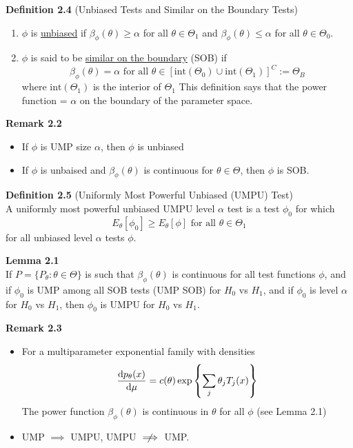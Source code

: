 \documentclass[12pt]{article}
\numberwithin{equation}{section}
\begin{document}
\textbf{Definition 2.4} (Unbiased Tests and Similar on the Boundary Tests)
\begin{enumerate}
  \item $\phi$ is \underline{unbiased} if $\beta_{\phi}(\theta) \ge \alpha$ for all $\theta \in \Theta_1$ and $\beta_{\phi}(\theta) \le \alpha$ for all 
  $\theta \in \Theta_0$. \\
  \item $\phi$ is said to be \underline{similar on the boundary} (SOB) if
  \begin{equation*}
    \beta_{\phi}(\theta) = \alpha \text{ for all } \theta \in 
      [\text{int}(\Theta_0) \cup \text{int}(\Theta_1)]^C := \Theta_B
  \end{equation*}
  where $\text{int}(\Theta_1)$ is the interior of $\Theta_1$ This definition says that the power function = $\alpha$ on the boundary of the parameter space.
\end{enumerate}

\textbf{Remark 2.2}
\begin{itemize}
  \item If $\phi$ is UMP size $\alpha$, then $\phi$ is unbiased
  \item If $\phi$ is unbaised and $\beta_{\phi}(\theta)$ is continuous for $\theta \in \Theta$, then $\phi$ is SOB. 
\end{itemize}

\textbf{Definition 2.5} (Uniformly Most Powerful Unbiased (UMPU) Test) \\
A uniformly most powerful unbiased UMPU level $\alpha$ test is a test $\phi_0$ for which
\begin{equation*}
  E_{\theta}[\phi_0] \ge E_{\theta}[\phi] \text{ for all } \theta \in \Theta_1
\end{equation*}
for all unbiased level $\alpha$ tests $\phi$. 

\textbf{Lemma 2.1} \\
If $P = \{P_{\theta} : \theta \in \Theta \}$ is such that $\beta_{\phi}(\theta)$ is continuous for all test functions $\phi$, and if $\phi_0$ is UMP among all SOB tests (UMP SOB) for $H_0$ vs $H_1$, and if $\phi_0$ is level $\alpha$ for $H_0$ vs $H_1$, then $\phi_0$ is UMPU for $H_0$ vs $H_1$.

\textbf{Remark 2.3}
\begin{itemize}
  \item For a multiparameter exponential family with densities
  \begin{equation*}
    \dv{p_{\theta}(x)}{\mu} = c(\theta)\exp\left\{\sum_j \theta_j T_j(x) \right\}
  \end{equation*}
  The power function $\beta_{\phi}(\theta)$ is continuous in $\theta$ for all $\phi$ (see Lemma 2.1)
  \item UMP $\implies$ UMPU, UMPU $\centernot \implies$ UMP.
\end{itemize}
\end{document}
